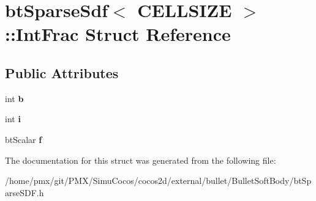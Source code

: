 \hypertarget{structbtSparseSdf_1_1IntFrac}{}\section{bt\+Sparse\+Sdf$<$ C\+E\+L\+L\+S\+I\+ZE $>$\+:\+:Int\+Frac Struct Reference}
\label{structbtSparseSdf_1_1IntFrac}
\subsection*{Public Attributes}
\begin{DoxyCompactItemize}
\item 
\mbox{\label{structbtSparseSdf_1_1IntFrac_a2ba2d547c0a54c9a2f881fd291734d90}} 
int {\bfseries b}
\item 
\mbox{\label{structbtSparseSdf_1_1IntFrac_aac7871826d74a313a6147a93b674d550}} 
int {\bfseries i}
\item 
\mbox{\label{structbtSparseSdf_1_1IntFrac_adf6a4b19e80b0dd76c3609d8f8ea5af9}} 
bt\+Scalar {\bfseries f}
\end{DoxyCompactItemize}


The documentation for this struct was generated from the following file\+:\begin{DoxyCompactItemize}
\item 
/home/pmx/git/\+P\+M\+X/\+Simu\+Cocos/cocos2d/external/bullet/\+Bullet\+Soft\+Body/bt\+Sparse\+S\+D\+F.\+h\end{DoxyCompactItemize}
